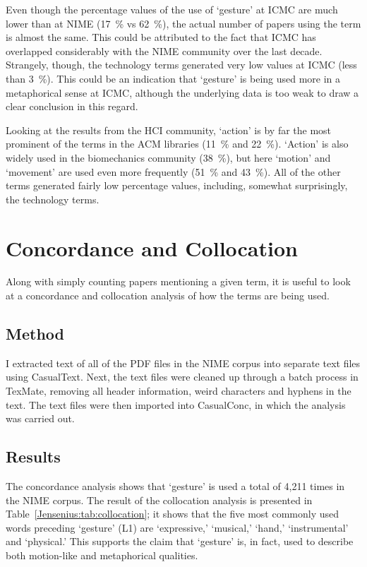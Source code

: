Even though the percentage values of the use of `gesture' at ICMC are much lower than at NIME (17~\% vs 62~\%), the actual number of papers using the term is almost the same. This could be attributed to the fact that ICMC has overlapped considerably with the NIME community over the last decade. Strangely, though, the technology terms generated very low values at ICMC (less than 3~\%). This could be an indication that `gesture' is being used more in a metaphorical sense at ICMC, although the underlying data is too weak to draw a clear conclusion in this regard. 

Looking at the results from the HCI community, `action' is by far the most prominent of the terms in the ACM libraries (11~\% and 22~\%). `Action' is also widely used in the biomechanics community (38~\%), but here `motion' and `movement' are used even more frequently (51~\% and 43~\%). All of the other terms generated fairly low percentage values, including, somewhat surprisingly, the technology terms. 


\section{Concordance and Collocation}

Along with simply counting papers mentioning a given term, it is useful to look at a concordance and collocation analysis of how the terms are being used.

\subsection{Method}

I extracted text of all of the PDF files in the NIME corpus into separate text files using CasualText. Next, the text files were cleaned up through a batch process in TexMate, removing all header information, weird characters and hyphens in the text. The text files were then imported into CasualConc, in which the analysis was carried out. 


\subsection{Results}

The concordance analysis shows that `gesture' is used a total of 4,211 times in the NIME corpus. The result of the collocation analysis is presented in Table~\ref{Jensenius:tab:collocation}; it shows that the five most commonly used words preceding `gesture' (L1) are `expressive,' `musical,' `hand,' `instrumental' and `physical.' This supports the claim that `gesture' is, in fact, used to describe both motion-like and metaphorical qualities. 

